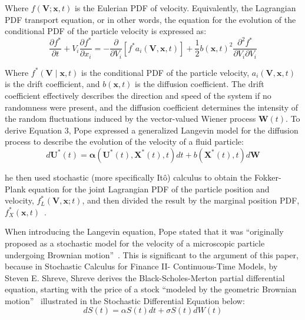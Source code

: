 \documentclass[12pt, onecolumn, journal]{IEEEtran}
\begin{document}
\noindent Where $f(\mathbf{V}; \mathbf{x}, t)$ is the Eulerian PDF of velocity. Equivalently, the Lagrangian PDF transport equation, or in other words, the equation for the evolution of the conditional PDF of the particle velocity is expressed as:
\begin{equation}
\frac{\partial f^*}{\partial t} + V_i \frac{\partial f^*}{\partial x_i} = - \frac{\partial}{\partial V_i} \left[f^* a_i(\mathbf{V}, \mathbf{x}, t)\right] + \frac{1}{2} b{\left(\mathbf{x}, t\right)}^2 \frac{\partial^2 f^*}{\partial V_i \partial V_i}
\end{equation}

\noindent Where $f^*\left(\mathbf{V} \middle| \mathbf{x}, t\right)$ is the conditional PDF of the particle velocity, $a_i(\mathbf{V}, \mathbf{x}, t)$ is the drift coefficient, and $b(\mathbf{x}, t)$ is the diffusion coefficient. The drift coefficient effectively describes the direction and speed of the system if no randomness were present, and the diffusion coefficient determines the intensity of the random fluctuations induced by the vector-valued Wiener process $\mathbf{W}(t)$. To derive Equation 3, Pope expressed a generalized Langevin model for the diffusion process to describe the evolution of the velocity of a fluid particle:
\begin{equation}
d \mathbf{U^*}(t) = \mathbf{\alpha}(\mathbf{U^*}(t), \mathbf{X^*}(t), t) dt + b(\mathbf{X^*}(t), t) d \mathbf{W}
\end{equation}

he then used stochastic (more specifically Itô) calculus to obtain the Fokker-Plank equation for the joint Lagrangian PDF of the particle position and velocity, $f^{*}_L(\mathbf{V}, \mathbf{x}; t)$, and then divided the result by the marginal position PDF, $f^{*}_X (\mathbf{x}, t)$~\cite{Pope2000}. 

When introducing the Langevin equation, Pope stated that it was “originally proposed as a stochastic model for the velocity of a microscopic particle undergoing Brownian motion”~\cite{Pope2000}. This is significant to the argument of this paper, because in Stochastic Calculus for Finance II- Continuous-Time Models, by Steven E. Shreve, Shreve derives the Black-Scholes-Merton partial differential equation, starting with the price of a stock “modeled by the geometric Brownian motion”~\cite{Shreve2004} illustrated in the Stochastic Differential Equation below:
\begin{equation}
dS(t) = \alpha S(t) dt + \sigma S(t) dW(t)
\end{equation}
\end{document}
